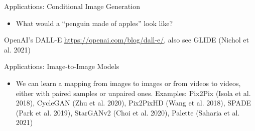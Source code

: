 \begin{frame}{Applications: Conditional Image Generation}
\protect\hypertarget{applications-conditional-image-generation-1}{}

\begin{itemize}
\tightlist
\item
  What would a ``penguin made of apples'' look like?
\end{itemize}


OpenAI's DALL-E \url{https://openai.com/blog/dall-e/}, also see GLIDE
(Nichol et al. 2021)

\end{frame}

\begin{frame}{Applications: Image-to-Image Models}
\protect\hypertarget{applications-image-to-image-models}{}

\begin{itemize}
\tightlist
\item
  We can learn a mapping from images to images or from videos to videos,
  either with paired samples or unpaired ones. Examples: Pix2Pix (Isola
  et al. 2018), CycleGAN (Zhu et al. 2020), Pix2PixHD (Wang et al.
  2018), SPADE (Park et al. 2019), StarGANv2 (Choi et al. 2020), Palette
  (Saharia et al. 2021)
\end{itemize}


\end{frame}

